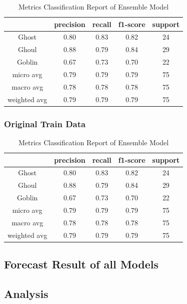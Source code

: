 \begin{table}[h]  \centering
	\caption{Metrics Classification Report of Ensemble Model}
	\label{tbl:metrics_classification_ensemble_old}
	\begin{tabular}{ccccc}
		\hline
		& precision  &  recall & f1-score &  support\\
		\hline
		Ghost   &    0.80   &   0.83  & 0.82 & 24\\
		Ghoul  &  0.88  &  0.79  &   0.84   &   29\\
		Goblin  &   0.67  &  0.73 &  0.70  &   22\\
		\hline
		micro avg  &  0.79  &  0.79  & 0.79    &  75\\
		macro avg  &  0.78  & 0.78  &  0.78  &  75\\
		weighted avg  &   0.79  &  0.79 &  0.79  &  75\\
		\hline 
	\end{tabular}
\end{table}
	
\subsubsection{Original Train Data}

\begin{table}[h]  \centering
	\caption{Metrics Classification Report of Ensemble Model}
	\label{tbl:metrics_classification_ensemble_new}
	\begin{tabular}{ccccc}
		\hline
		& precision  &  recall & f1-score &  support\\
		\hline
		Ghost   &    0.80   &   0.83  & 0.82 & 24\\
		Ghoul  &  0.88  &  0.79  &   0.84   &   29\\
		Goblin  &   0.67  &  0.73 &  0.70  &   22\\
		\hline
		micro avg  &  0.79  &  0.79  & 0.79    &  75\\
		macro avg  &  0.78  & 0.78  &  0.78  &  75\\
		weighted avg  &   0.79  &  0.79 &  0.79  &  75\\
		\hline 
	\end{tabular}
\end{table}	

\subsection{Forecast Result of all Models}

\subsection{Analysis}
 




